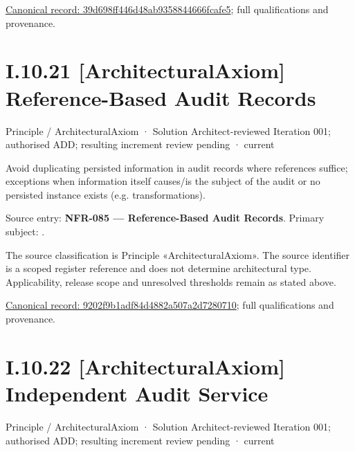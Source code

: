 {\footnotesize \href{../../../../../../../continuum/motivation/principle/39d698ff446d48ab9358844666fcafe5.md}{Canonical record: 39d698ff446d48ab9358844666fcafe5}; full qualifications and provenance.}\par
\section*{I.10.21 [ArchitecturalAxiom] Reference-Based Audit Records}
\label{navigation:I.10.21}

\label{element:9202f9b1adf84d4882a507a2d7280710}
{\small Principle / ArchitecturalAxiom · Solution Architect-reviewed Iteration 001; authorised ADD; resulting increment review pending · current}\par

Avoid duplicating persisted information in audit records where references suffice; exceptions when information itself causes/is the subject of the audit or no persisted instance exists (e.g. transformations).



Source entry: \textbf{NFR-085 — Reference-Based Audit Records}. Primary subject: \texttt{}.



The source classification is Principle «ArchitecturalAxiom». The source identifier is a scoped register reference and does not determine architectural type. Applicability, release scope and unresolved thresholds remain as stated above.


{\footnotesize \href{../../../../../../../continuum/motivation/principle/architectural-axiom/9202f9b1adf84d4882a507a2d7280710.md}{Canonical record: 9202f9b1adf84d4882a507a2d7280710}; full qualifications and provenance.}\par
\section*{I.10.22 [ArchitecturalAxiom] Independent Audit Service}
\label{navigation:I.10.22}

\label{element:41fa01556ade4f22a35288b072113767}
{\small Principle / ArchitecturalAxiom · Solution Architect-reviewed Iteration 001; authorised ADD; resulting increment review pending · current}\par

